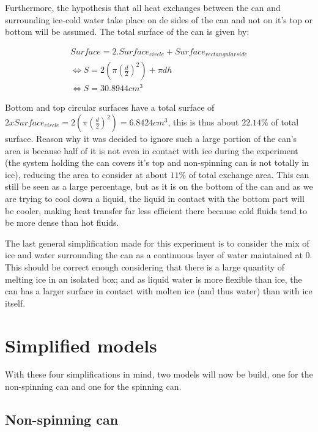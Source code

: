 \documentclass{report}
\begin{document}
	Furthermore, the hypothesis that all heat exchanges between the can and surrounding ice-cold water take place on de sides of the can and not on it's top or bottom will be assumed. The total surface of the can is given by:
	
	\begin{equation}
	\begin{gathered}
		Surface= 2.Surface_{circle} + Surface_{rectangular side} \\
		\Leftrightarrow S= 2 (\pi  (\frac{d}{2})^2) + \pi dh \\
		\Leftrightarrow S= 30.8944 cm^3
	\end{gathered}
	\end{equation}
	
	Bottom and top circular surfaces have a total surface of $2xSurface_{circle}=2 (\pi  (\frac{d}{2})^2)= 6.8424 cm^3$, this is thus about $22.14\% $ of total surface. Reason why it was decided to ignore such a large portion of the can's area is because half of it is not even in contact with ice during the experiment (the system holding the can covers it's top and non-spinning can is not totally in ice), reducing the area to consider at about $11\% $ of total exchange area. This can still be seen as a large percentage, but as it is on the bottom of the can and as we are trying to cool down a liquid, the liquid in contact with the bottom part will be cooler, making heat transfer far less efficient there because cold fluids tend to be more dense than hot fluids.
	
	The last general simplification made for this experiment is to consider the mix of ice and water surrounding the can as a continuous layer of water maintained at 0\textcelsius. This should be correct enough considering that there is a large quantity of melting ice in an isolated box; and as liquid water is more flexible than ice, the can has a larger surface in contact with molten ice (and thus water) than with ice itself.
	
	
	\section{Simplified models}\label{sm}
	
	With these four simplifications in mind, two models will now be build, one for the non-spinning can and one for the spinning can.
	
	\subsection{Non-spinning can}\label{nsc}
	
\end{document}
